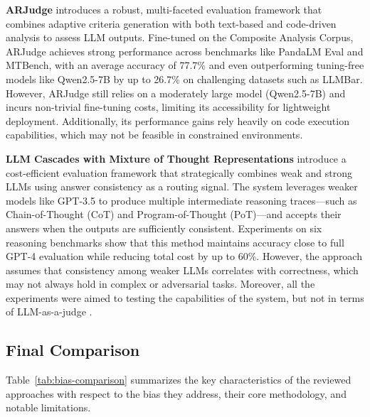 \documentclass[sigconf, authoryear]{acmart}
\begin{document}
\textbf{ARJudge} introduces a robust, multi-faceted evaluation framework that combines adaptive criteria generation with both text-based and code-driven analysis to assess LLM outputs.
Fine-tuned on the Composite Analysis Corpus, ARJudge achieves strong performance across benchmarks like PandaLM Eval and MTBench, with an average accuracy of 77.7\% and even outperforming tuning-free models like Qwen2.5-7B by up to 26.7\% on challenging datasets such as LLMBar.
However, ARJudge still relies on a moderately large model (Qwen2.5-7B) and incurs non-trivial fine-tuning costs, limiting its accessibility for lightweight deployment.
Additionally, its performance gains rely heavily on code execution capabilities, which may not be feasible in constrained environments\cite{ar_judge}.


\textbf{LLM Cascades with Mixture of Thought Representations} introduce a cost-efficient evaluation framework that strategically combines weak and strong LLMs using answer consistency as a routing signal.
The system leverages weaker models like GPT-3.5 to produce multiple intermediate reasoning traces—such as Chain-of-Thought (CoT) and Program-of-Thought (PoT)—and accepts their answers when the outputs are sufficiently consistent.
Experiments on six reasoning benchmarks show that this method maintains accuracy close to full GPT-4 evaluation while reducing total cost by up to 60\%.
However, the approach assumes that consistency among weaker LLMs correlates with correctness, which may not always hold in complex or adversarial tasks.
Moreover, all the experiments were aimed to testing the capabilities of the system, but not in terms of LLM-as-a-judge \cite{yue2024largelanguagemodelcascades}.

\subsection{Final Comparison}\label{subsec:final-comparison}

Table~\ref{tab:bias-comparison} summarizes the key characteristics of the reviewed approaches with respect to the bias they address, their core methodology, and notable limitations.
\end{document}
